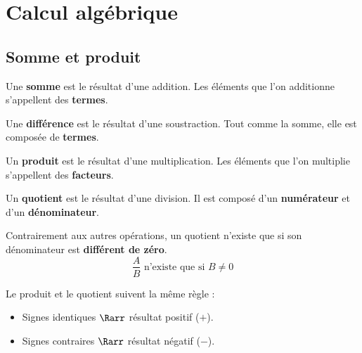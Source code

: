 \chapter{Calcul algébrique}

\section{Somme et produit}

\begin{defin}
	Une \textbf{somme} est le résultat d'une addition. Les éléments que l'on additionne s'appellent des \textbf{termes}.

	Une \textbf{différence} est le résultat d'une soustraction. Tout comme la somme, elle est composée de \textbf{termes}.

	Un \textbf{produit} est le résultat d'une multiplication. Les éléments que l'on multiplie s'appellent des \textbf{facteurs}.

	Un \textbf{quotient} est le résultat d'une division. Il est composé d'un \textbf{numérateur} et d'un \textbf{dénominateur}.
\end{defin}

\begin{attention}
	Contrairement aux autres opérations, un quotient n'existe que si son dénominateur est \textbf{différent de zéro}.
	\[
		\frac{A}{B} \text{ n'existe que si } B \neq 0
	\]
\end{attention}

\begin{rem}
	Le produit et le quotient suivent la même règle :
	\begin{itemize}
		\item Signes identiques $\Rarr$ résultat positif ($+$).
		\item Signes contraires $\Rarr$ résultat négatif ($-$).
	\end{itemize}
\end{rem}


